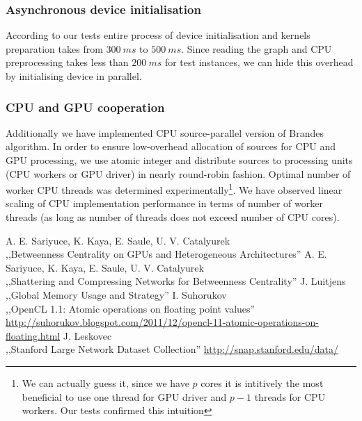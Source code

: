 \subsubsection*{Asynchronous device initialisation}

According to our tests entire process of device initialisation and kernels preparation takes from $\SI{300}{ms}$ to $\SI{500}{ms}$.
Since reading the graph and CPU preprocessing takes less than $\SI{200}{ms}$ for test instances, we can hide this overhead by initialising device in parallel.

\subsubsection*{CPU and GPU cooperation}

Additionally we have implemented CPU source-parallel version of Brandes algorithm.
In order to ensure low-overhead allocation of sources for CPU and GPU processing, we use atomic integer and distribute sources to processing units (CPU workers or GPU driver) in nearly round-robin fashion.
Optimal number of worker CPU threads was determined experimentally\footnote{We can actually guess it, since we have $p$ cores it is intitively the most beneficial to use one thread for GPU driver and $p - 1$ threads for CPU workers. Our tests confirmed this intuition}.
We have observed linear scaling of CPU implementation performance in terms of number of worker threads (as long as number of threads does not exceed number of CPU cores).


\begin{thebibliography}{9}
   A. E. Sariyuce, K. Kaya, E. Saule, U. V. Catalyurek \\
    \newblock ,,Betweenness Centrality on GPUs and Heterogeneous Architectures''
   A. E. Sariyuce, K. Kaya, E. Saule, U. V. Catalyurek \\
    \newblock ,,Shattering and Compressing Networks for Betweenness Centrality''
   J. Luitjens \\
    \newblock ,,Global Memory Usage and Strategy''
   I. Suhorukov \\
    \newblock ,,OpenCL 1.1: Atomic operations on floating point values'' \\
    \newblock \url{http://suhorukov.blogspot.com/2011/12/opencl-11-atomic-operations-on-floating.html}
   J. Leskovec \\
    \newblock ,,Stanford Large Network Dataset Collection''
    \newblock \url{http://snap.stanford.edu/data/}
\end{thebibliography}


